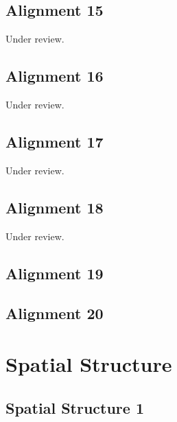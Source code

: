 \documentclass{scrartcl}
\begin{document}
\subsection{Alignment 15} %
\label{sec:align_15}
Under review.%
\clearpage

\subsection{Alignment 16} %
\label{sec:align_16}
Under review.%
\clearpage

\subsection{Alignment 17} %
\label{sec:align_17}
Under review.%
\clearpage

\subsection{Alignment 18} %
\label{sec:align_18}
Under review.%
\clearpage

\subsection{Alignment 19} %
\label{sec:align_19}
\clearpage

\subsection{Alignment 20} %
\label{sec:align_20}
\clearpage

\section{Spatial Structure}
\label{sec:spatial_structure}

\subsection{Spatial Structure 1}
\label{sec:spatial_1}
\clearpage
\end{document}
